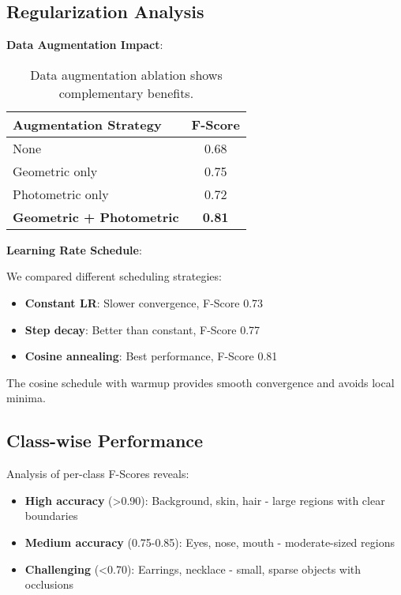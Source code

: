 \subsection{Regularization Analysis}

\textbf{Data Augmentation Impact}:

\begin{table}[h]
\centering
\small
\begin{tabular}{lc}
\hline
Augmentation Strategy & F-Score \\
\hline
None & 0.68 \\
Geometric only & 0.75 \\
Photometric only & 0.72 \\
\textbf{Geometric + Photometric} & \textbf{0.81} \\
\hline
\end{tabular}
\caption{Data augmentation ablation shows complementary benefits.}
\end{table}

\textbf{Learning Rate Schedule}:

We compared different scheduling strategies:
\begin{itemize}
    \item \textbf{Constant LR}: Slower convergence, F-Score 0.73
    \item \textbf{Step decay}: Better than constant, F-Score 0.77
    \item \textbf{Cosine annealing}: Best performance, F-Score 0.81
\end{itemize}

The cosine schedule with warmup provides smooth convergence and avoids local minima.

\subsection{Class-wise Performance}

Analysis of per-class F-Scores reveals:

\begin{itemize}
    \item \textbf{High accuracy} (>0.90): Background, skin, hair - large regions with clear boundaries
    \item \textbf{Medium accuracy} (0.75-0.85): Eyes, nose, mouth - moderate-sized regions
    \item \textbf{Challenging} (<0.70): Earrings, necklace - small, sparse objects with occlusions
\end{itemize}

